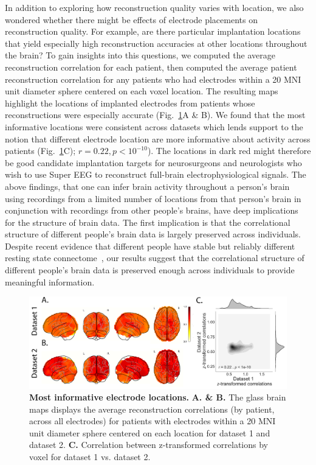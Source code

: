 \documentclass[12pt]{article}
\begin{document}
In addition to exploring how reconstruction quality varies with
location, we also wondered whether there might be effects of electrode
placements on reconstruction quality.  For example, are there
particular implantation locations that yield especially high
reconstruction accuracies at other locations throughout the brain? To gain insights into this questions, we computed the average reconstruction correlation for each patient, then computed the average patient reconstruction correlation for any patients who had electrodes within a 20 MNI unit diameter sphere centered on each voxel location. The resulting maps highlight the locations of implanted electrodes from patients whose
reconstructions were especially accurate  (Fig.~\ref{fig:informap}A & B). We found that the most informative locations were consistent across datasets which lends support to the notion that different electrode location are more informative about activity across patients (Fig.~\ref{fig:informap}C); $r = 0.22, p < 10^{-10}$).  The locations in dark red might therefore be good candidate
implantation targets for neurosurgeons and neurologists who wish to
use Super EEG to reconstruct full-brain electrophysiological signals.
The above findings, that one can infer brain activity throughout a person's brain 
using recordings from a limited number of locations from that person's brain in conjunction with recordings from other people's brains, have deep
implications for the structure of brain data.  The first implication
is that the correlational structure of different people's brain data
is largely preserved across individuals. Despite recent evidence that different people have stable but reliably different resting state connectome~\cite{FinnEtal15}, our results suggest that the correlational structure of different people's brain data is preserved enough across individuals to provide meaningful information. 

\begin{figure}
  \centering
  \includegraphics[width=\textwidth]{figs/informap}
  \caption{\textbf{Most informative electrode locations.} \textbf{A. \& B. } The glass
    brain maps displays the average reconstruction correlations (by patient, across
    all electrodes) for patients with electrodes within a 20 MNI unit diameter sphere centered on
    each location for dataset 1 and dataset 2. \textbf{C.} Correlation between z-transformed correlations by voxel for dataset 1 vs. dataset 2.}
  \label{fig:informap}
\end{figure}
\end{document}
